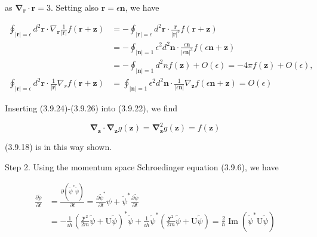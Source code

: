 \documentclass{article}
\begin{document}
as $\boldsymbol{\nabla}_{\boldsymbol{r}} \cdot \boldsymbol{r}=3$. Setting also $\boldsymbol{r}=\epsilon \boldsymbol{n}$, we have
 
\begin{align*}
\oint_{|\boldsymbol{r}|=\epsilon} d^{2} \boldsymbol{r} \cdot \nabla_{\boldsymbol{r}} \frac{1}{|\boldsymbol{r}|} f(\boldsymbol{r}+\boldsymbol{z}) & =-\oint_{|\boldsymbol{r}|=\epsilon} d^{2} \boldsymbol{r} \cdot \frac{\boldsymbol{r}}{|\boldsymbol{r}|^{3}} f(\boldsymbol{r}+\boldsymbol{z})  \tag{3.9.25}\\
& =-\oint_{|\boldsymbol{n}|=1} \epsilon^{2} d^{2} \boldsymbol{n} \cdot \frac{\epsilon \boldsymbol{n}}{|\epsilon \boldsymbol{n}|^{3}} f(\epsilon \boldsymbol{n}+\boldsymbol{z}) \\
& =-\oint_{|\boldsymbol{n}|=1} d^{2} n f(\boldsymbol{z})+O(\epsilon)=-4 \pi f(\boldsymbol{z})+O(\epsilon), \\
\oint_{|\boldsymbol{r}|=\epsilon} d^{2} \boldsymbol{r} \cdot \frac{1}{|\boldsymbol{r}|} \nabla_{r} f(\boldsymbol{r}+\boldsymbol{z}) & =\oint_{|\boldsymbol{n}|=1} \epsilon^{2} d^{2} \boldsymbol{n} \cdot \frac{1}{|\epsilon \boldsymbol{n}|} \nabla_{\boldsymbol{z}} f(\epsilon \boldsymbol{n}+\boldsymbol{z})=O(\epsilon) \tag{3.9.26}
\end{align*}
 

Inserting (3.9.24)-(3.9.26) into (3.9.22), we find
 
\begin{equation*}
\boldsymbol{\nabla}_{\boldsymbol{z}} \cdot \boldsymbol{\nabla}_{\boldsymbol{z}} g(\boldsymbol{z})=\boldsymbol{\nabla}_{\boldsymbol{z}}^{2} g(\boldsymbol{z})=f(\boldsymbol{z}) \tag{3.9.27}
\end{equation*}
 
(3.9.18) is in this way shown.

Step 2. Using the momentum space Schroedinger equation (3.9.6), we have
 
\begin{align*}
\frac{\partial \tilde{\rho}}{\partial t} & =\frac{\partial\left(\tilde{\psi}^{*} \tilde{\psi}\right)}{\partial t}=\frac{\partial \tilde{\psi}^{*}}{\partial t} \psi+\tilde{\psi}^{*} \frac{\partial \tilde{\psi}}{\partial t}  \tag{3.9.28}\\
& =-\frac{1}{i \hbar}\left(\frac{\boldsymbol{y}^{2}}{2 m} \tilde{\psi}+\mathrm{U} \tilde{\psi}\right)^{*} \tilde{\psi}+\frac{1}{i \hbar} \tilde{\psi}^{*}\left(\frac{\boldsymbol{y}^{2}}{2 m} \tilde{\psi}+\mathrm{U} \tilde{\psi}\right)=\frac{2}{\hbar} \operatorname{Im}\left(\tilde{\psi}^{*} \mathrm{U} \tilde{\psi}\right)
\end{align*}
 
\end{document}

